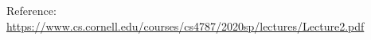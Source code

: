 \documentclass{article}
\theoremstyle{plain}
\theoremstyle{definition}
\theoremstyle{remark}
\begin{document}
Reference: \url{https://www.cs.cornell.edu/courses/cs4787/2020sp/lectures/Lecture2.pdf}

% 
% 

\newpage
\appendix
\onecolumn
\end{document}
